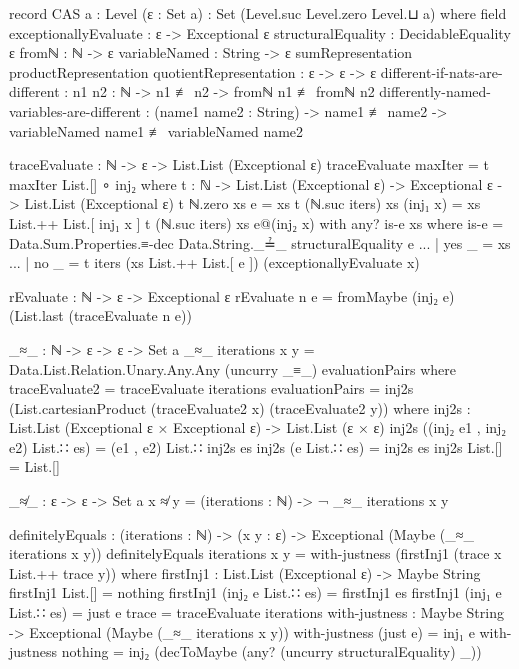 \documentclass{report}
\begin{document}
\begin{code}
record CAS {a : Level} (ε : Set a) : Set (Level.suc Level.zero Level.⊔ a) where
  field
    exceptionallyEvaluate : ε -> Exceptional ε
    structuralEquality : DecidableEquality ε
    fromℕ : ℕ -> ε
    variableNamed : String -> ε
    sumRepresentation
     productRepresentation
     quotientRepresentation : ε -> ε -> ε
    different-if-nats-are-different :
      {n1 n2 : ℕ} -> n1 ≢ n2 -> fromℕ n1 ≢ fromℕ n2
    differently-named-variables-are-different :
      (name1 name2 : String) ->
      name1 ≢ name2 ->
      variableNamed name1 ≢ variableNamed name2

  traceEvaluate : ℕ -> ε -> List.List (Exceptional ε)
  traceEvaluate maxIter = t maxIter List.[] ∘ inj₂
    where
    t : ℕ -> List.List (Exceptional ε) -> Exceptional ε -> List.List (Exceptional ε)
    t ℕ.zero xs e = xs
    t (ℕ.suc iters) xs (inj₁ x) = xs List.++ List.[ inj₁ x ]
    t (ℕ.suc iters) xs e@(inj₂ x) with any? is-e xs
      where is-e = Data.Sum.Properties.≡-dec Data.String._≟_ structuralEquality e
    ... | yes _ = xs
    ... | no _ = t iters (xs List.++ List.[ e ]) (exceptionallyEvaluate x)

  rEvaluate : ℕ -> ε -> Exceptional ε
  rEvaluate n e = fromMaybe (inj₂ e) (List.last (traceEvaluate n e))

  _≈_ : ℕ -> ε -> ε -> Set a
  _≈_ iterations x y = Data.List.Relation.Unary.Any.Any (uncurry _≡_) evaluationPairs
    where
    traceEvaluate2 = traceEvaluate iterations
    evaluationPairs = inj2s (List.cartesianProduct (traceEvaluate2 x) (traceEvaluate2 y))
      where
      inj2s : List.List (Exceptional ε × Exceptional ε) -> List.List (ε × ε)
      inj2s ((inj₂ e1 , inj₂ e2) List.∷ es) = (e1 , e2) List.∷ inj2s es
      inj2s (e List.∷ es) = inj2s es
      inj2s List.[] = List.[]

  _≉_ : ε -> ε -> Set a
  x ≉ y = (iterations : ℕ) -> ¬ _≈_ iterations x y

  definitelyEquals : (iterations : ℕ) ->
                     (x y : ε) ->
                     Exceptional (Maybe (_≈_ iterations x y))
  definitelyEquals iterations x y = with-justness (firstInj1 (trace x List.++ trace y))
    where
    firstInj1 : List.List (Exceptional ε) -> Maybe String
    firstInj1 List.[] = nothing
    firstInj1 (inj₂ e List.∷ es) = firstInj1 es
    firstInj1 (inj₁ e List.∷ es) = just e
    trace = traceEvaluate iterations
    with-justness : Maybe String ->
                    Exceptional (Maybe (_≈_ iterations x y))
    with-justness (just e) = inj₁ e
    with-justness nothing =
      inj₂ (decToMaybe (any? (uncurry structuralEquality) _))


\end{code}
\end{document}
